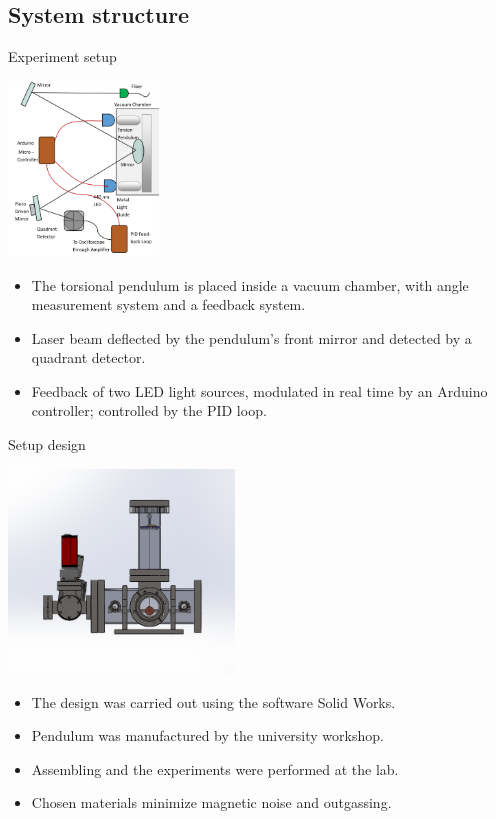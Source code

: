 \documentclass{beamer}
\begin{document}
\subsection{System structure}
\begin{frame}{Experiment setup}
	\begin{center}		
			\includegraphics[width=0.3\textwidth,keepaspectratio]{setup cropped.png}
	\end{center}
	\begin{itemize}

		\item The torsional pendulum is placed inside a vacuum chamber, with angle measurement system and a feedback system. 
		\item Laser beam deflected by the pendulum's front mirror and detected by a quadrant detector.
		\item Feedback of two LED light sources, modulated in real time by an Arduino controller; controlled by the PID loop.
	
	\end{itemize}
	
\end{frame}
\begin{frame}{Setup design}
	\begin{center}		
			\includegraphics[width=0.45\textwidth,keepaspectratio]{total_chamber.png}
	\end{center}
	\begin{itemize}

		\item The design was carried out using the software Solid Works.
		\item Pendulum was manufactured by the university workshop.
		\item Assembling and the experiments were performed at the lab.
		\item Chosen materials minimize magnetic noise and outgassing.
	
	\end{itemize}
	
\end{frame}
\end{document}

